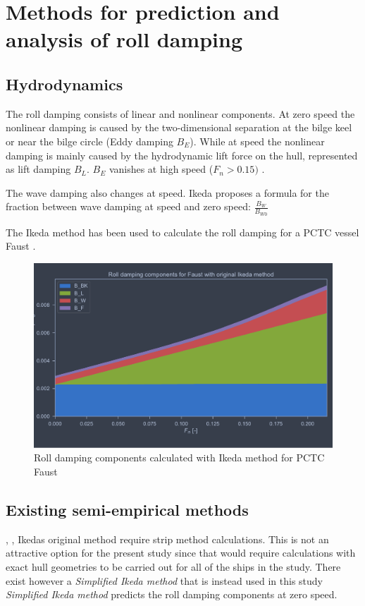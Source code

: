 \section{Methods for prediction and analysis of roll damping}
\label{se:methods_for_prediction_and_analysis}

\subsection{Hydrodynamics}
\label{se:hydrodynamics}
The roll damping consists of linear and nonlinear components. At zero speed the nonlinear damping is caused by the two-dimensional separation at the bilge keel or near the bilge circle (Eddy damping $B_E$). While at speed the nonlinear damping is mainly caused by the hydrodynamic lift force on the hull, represented as lift damping $B_L$. $B_E$ vanishes at high speed ($F_n>0.15)$ \cite{ikeda_components_1978}.

The wave damping also changes at speed. Ikeda \cite{ikeda_components_1978} proposes a formula for the fraction between wave damping at speed and zero speed: $\frac{B_W}{B_{W0}}$

The Ikeda method has been used to calculate the roll damping for a PCTC vessel Faust \cite{soder_assessment_2019}.
\begin{figure}[h]
    \centering
    \includegraphics[width=\columnwidth]{figures/ikeda_faust.pdf}
    \caption{Roll damping components calculated with Ikeda method for PCTC Faust}
    \label{fig:ikeda_faust}
\end{figure}

\subsection{Existing semi-empirical methods}
\cite{ikeda_eddy_1978}, \cite{ikeda_roll_1979}, \cite{ikeda_components_1978}
Ikedas original method require strip method calculations. This is not an attractive option for the present study since that would require calculations with exact hull geometries to be carried out for all of the ships in the study. There exist however a \emph{Simplified Ikeda method} \cite{kawahara_simple_2011} that is instead used in this study \emph{Simplified Ikeda method} predicts the roll damping components at zero speed.

